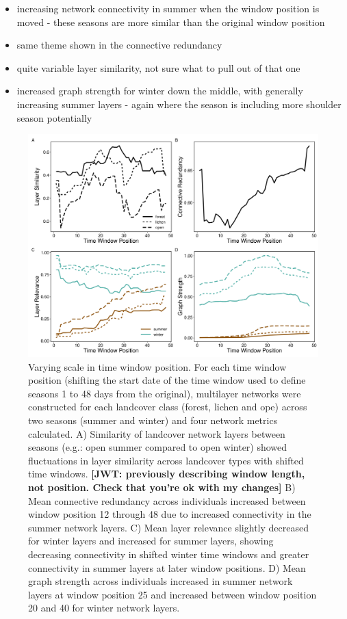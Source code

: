 \documentclass[]{article}
\providecommand{\tightlist}{%
  \setlength{\itemsep}{0pt}\setlength{\parskip}{0pt}}
\begin{document}
\begin{itemize}
\tightlist
\item
  increasing network connectivity in summer when the window position is moved - these seasons are more similar than the original window position
\item
  same theme shown in the connective redundancy
\item
  quite variable layer similarity, not sure what to pull out of that one
\item
  increased graph strength for winter down the middle, with generally increasing summer layers - again where the season is including more shoulder season potentially
\end{itemize}

\begin{figure}
\includegraphics[width=\linewidth]{../graphics/figure-winpos} \caption{Varying scale in time window position. For each time window position (shifting the start date of the time window used to define seasons 1 to 48 days from the original), multilayer networks were constructed for each landcover class (forest, lichen and ope) across two seasons (summer and winter) and four network metrics calculated. A) Similarity of landcover network layers between seasons (e.g.: open summer compared to open winter) showed fluctuations in layer similarity across landcover types with shifted time windows. \textbf{{[}JWT: previously describing window length, not position. Check that you're ok with my changes{]}} B) Mean connective redundancy across individuals increased between window position 12 through 48 due to increased connectivity in the summer network layers. C) Mean layer relevance slightly decreased for winter layers and increased for summer layers, showing decreasing connectivity in shifted winter time windows and greater connectivity in summer layers at later window positions. D) Mean graph strength across individuals increased in summer network layers at window position 25 and increased between window position 20 and 40 for winter network layers.}\label{fig:unnamed-chunk-6}
\end{figure}
\end{document}
